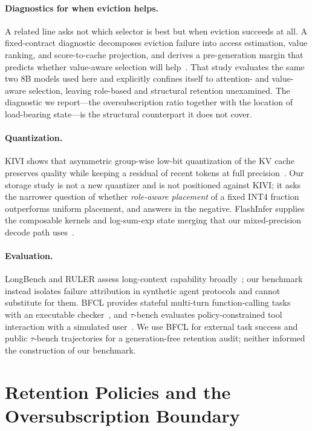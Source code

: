\paragraph{Diagnostics for when eviction helps.}
A related line asks not which selector is best but when eviction succeeds at
all.  A fixed-contract diagnostic decomposes eviction failure into access
estimation, value ranking, and score-to-cache projection, and derives a
pre-generation margin that predicts whether value-aware selection will
help~\cite{valuediag}.  That study evaluates the same two 8B models used here
and explicitly confines itself to attention- and value-aware selection, leaving
role-based and structural retention unexamined.  The diagnostic we report---the
oversubscription ratio together with the location of load-bearing state---is
the structural counterpart it does not cover.

\paragraph{Quantization.}
KIVI shows that asymmetric group-wise low-bit quantization of the KV cache
preserves quality while keeping a residual of recent tokens at full
precision~\cite{liu2024kivi}.  Our storage study is not a new quantizer and is
not positioned against KIVI; it asks the narrower question of whether
\emph{role-aware placement} of a fixed INT4 fraction outperforms uniform
placement, and answers in the negative.  FlashInfer supplies the composable
kernels and log-sum-exp state merging that our mixed-precision decode path
uses~\cite{ye2025flashinfer}.

\paragraph{Evaluation.}
LongBench and RULER assess long-context capability
broadly~\cite{bai2024longbench,hsieh2024ruler}; our benchmark instead isolates
failure attribution in synthetic agent protocols and cannot substitute for
them.  BFCL provides stateful multi-turn function-calling tasks with an
executable checker~\cite{patil2025bfcl}, and $\tau$-bench evaluates
policy-constrained tool interaction with a simulated user~\cite{yao2024taubench}.
We use BFCL for external task success and public $\tau$-bench trajectories for a
generation-free retention audit; neither informed the construction of our
benchmark.

\section{Retention Policies and the Oversubscription Boundary}
\label{sec:method}

